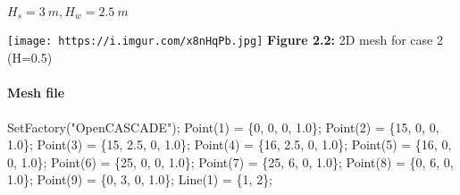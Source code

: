 \documentclass[11pt]{article}
\newenvironment{Shaded}{}{}
\newcommand{\DecValTok}[1]{\textcolor[rgb]{0.25,0.63,0.44}{{#1}}}
\newcommand{\FloatTok}[1]{\textcolor[rgb]{0.25,0.63,0.44}{{#1}}}
\newcommand{\StringTok}[1]{\textcolor[rgb]{0.25,0.44,0.63}{{#1}}}
\newcommand{\NormalTok}[1]{{#1}}
\newcommand{\OperatorTok}[1]{\textcolor[rgb]{0.40,0.40,0.40}{{#1}}}
\begin{document}
\(H_s = 3\ m, H_w = 2.5\ m\)

\texttt{[image: https://i.imgur.com/x8nHqPb.jpg]} \textbf{Figure 2.2:}
2D mesh for case 2 (H=0.5)

\hypertarget{mesh-file-1}{%
\paragraph{Mesh file}\label{mesh-file-1}}

\begin{Shaded}
\begin{Highlighting}[]
\NormalTok{SetFactory}\OperatorTok{(}\StringTok{"OpenCASCADE"}\OperatorTok{);}
\NormalTok{Point}\OperatorTok{(}\DecValTok{1}\OperatorTok{)} \OperatorTok{=} \OperatorTok{\{}\DecValTok{0}\OperatorTok{,} \DecValTok{0}\OperatorTok{,} \DecValTok{0}\OperatorTok{,} \FloatTok{1.0}\OperatorTok{\};}
\NormalTok{Point}\OperatorTok{(}\DecValTok{2}\OperatorTok{)} \OperatorTok{=} \OperatorTok{\{}\DecValTok{15}\OperatorTok{,} \DecValTok{0}\OperatorTok{,} \DecValTok{0}\OperatorTok{,} \FloatTok{1.0}\OperatorTok{\};}
\NormalTok{Point}\OperatorTok{(}\DecValTok{3}\OperatorTok{)} \OperatorTok{=} \OperatorTok{\{}\DecValTok{15}\OperatorTok{,} \FloatTok{2.5}\OperatorTok{,} \DecValTok{0}\OperatorTok{,} \FloatTok{1.0}\OperatorTok{\};}
\NormalTok{Point}\OperatorTok{(}\DecValTok{4}\OperatorTok{)} \OperatorTok{=} \OperatorTok{\{}\DecValTok{16}\OperatorTok{,} \FloatTok{2.5}\OperatorTok{,} \DecValTok{0}\OperatorTok{,} \FloatTok{1.0}\OperatorTok{\};}
\NormalTok{Point}\OperatorTok{(}\DecValTok{5}\OperatorTok{)} \OperatorTok{=} \OperatorTok{\{}\DecValTok{16}\OperatorTok{,} \DecValTok{0}\OperatorTok{,} \DecValTok{0}\OperatorTok{,} \FloatTok{1.0}\OperatorTok{\};}
\NormalTok{Point}\OperatorTok{(}\DecValTok{6}\OperatorTok{)} \OperatorTok{=} \OperatorTok{\{}\DecValTok{25}\OperatorTok{,} \DecValTok{0}\OperatorTok{,} \DecValTok{0}\OperatorTok{,} \FloatTok{1.0}\OperatorTok{\};}
\NormalTok{Point}\OperatorTok{(}\DecValTok{7}\OperatorTok{)} \OperatorTok{=} \OperatorTok{\{}\DecValTok{25}\OperatorTok{,} \DecValTok{6}\OperatorTok{,} \DecValTok{0}\OperatorTok{,} \FloatTok{1.0}\OperatorTok{\};}
\NormalTok{Point}\OperatorTok{(}\DecValTok{8}\OperatorTok{)} \OperatorTok{=} \OperatorTok{\{}\DecValTok{0}\OperatorTok{,} \DecValTok{6}\OperatorTok{,} \DecValTok{0}\OperatorTok{,} \FloatTok{1.0}\OperatorTok{\};}
\NormalTok{Point}\OperatorTok{(}\DecValTok{9}\OperatorTok{)} \OperatorTok{=} \OperatorTok{\{}\DecValTok{0}\OperatorTok{,} \DecValTok{3}\OperatorTok{,} \DecValTok{0}\OperatorTok{,} \FloatTok{1.0}\OperatorTok{\};}
\NormalTok{Line}\OperatorTok{(}\DecValTok{1}\OperatorTok{)} \OperatorTok{=} \OperatorTok{\{}\DecValTok{1}\OperatorTok{,} \DecValTok{2}\OperatorTok{\};}

\end{Highlighting}
\end{Shaded}
\end{document}
